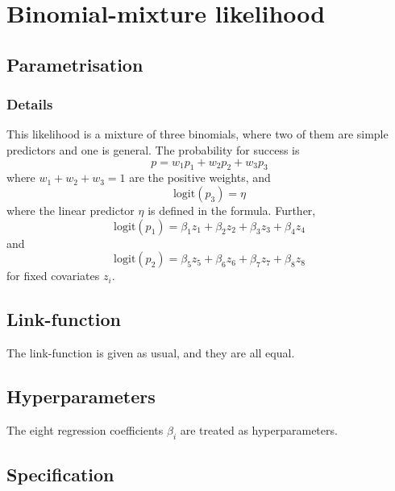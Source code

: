 \documentclass[a4paper,11pt]{article}
\begin{document}
\section*{Binomial-mixture likelihood}

\subsection*{Parametrisation}

\subsubsection*{Details}

This likelihood is a mixture of three binomials, where two of them are
simple predictors and one is general. The probability for success is
\begin{displaymath}
    p = w_1 p_1 + w_2 p_2 + w_3 p_3
\end{displaymath}
where $w_1 + w_2 + w_3 = 1$ are the positive weights, and
\begin{displaymath}
    \text{logit}(p_3) = \eta
\end{displaymath}
where the linear predictor $\eta$ is defined in the formula. Further,
\begin{displaymath}
    \text{logit}(p_1) = \beta_{1} z_{1} + \beta_{2} z_{2} +
    \beta_{3} z_{3} + \beta_4 z_4
\end{displaymath}
and
\begin{displaymath}
    \text{logit}(p_2) = \beta_{5} z_{5} +
    \beta_{6} z_{6} + \beta_7 z_7 + \beta_8 z_8
\end{displaymath}
for fixed covariates $z_{i}$. 

\subsection*{Link-function}

The link-function is given as usual, and they are all equal.

\subsection*{Hyperparameters}

The eight regression coefficients $\beta_{i}$ are treated as
hyperparameters. 

\subsection*{Specification}
\end{document}
